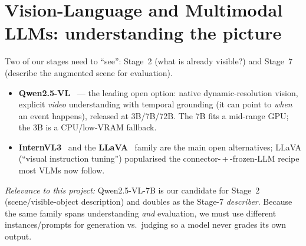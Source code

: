 \documentclass[11pt,a4paper]{article}
\newcommand{\rel}[1]{\smallskip\noindent\textit{Relevance to this project:} #1}
\begin{document}
\section{Vision-Language and Multimodal LLMs: understanding the picture}
Two of our stages need to ``see'': Stage~2 (what is already visible?) and Stage~7 (describe the
augmented scene for evaluation).
\begin{itemize}
  \item \textbf{Qwen2.5-VL}~\cite{qwenvl} --- the leading open option: native dynamic-resolution
    vision, explicit \emph{video} understanding with temporal grounding (it can point to \emph{when}
    an event happens), released at 3B/7B/72B. The 7B fits a mid-range GPU; the 3B is a CPU/low-VRAM
    fallback.
  \item \textbf{InternVL3}~\cite{internvl} and the \textbf{LLaVA}~\cite{llava} family are the main
    open alternatives; LLaVA (``visual instruction tuning'') popularised the connector-\,+\,-frozen-LLM
    recipe most VLMs now follow.
\end{itemize}
\rel{Qwen2.5-VL-7B is our candidate for Stage~2 (scene/visible-object description) and doubles as the
Stage-7 \emph{describer}. Because the same family spans understanding \emph{and} evaluation, we must
use different instances/prompts for generation vs.\ judging so a model never grades its own output.}

\end{document}
